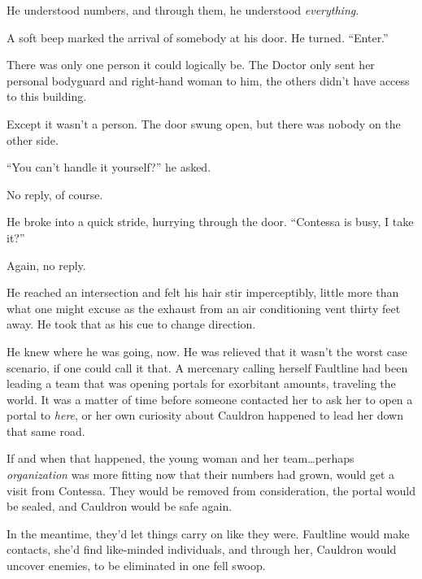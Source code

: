 He understood numbers, and through them, he understood \emph{everything}.



A soft beep marked the arrival of somebody at his door.  He turned.  ``Enter.''



There was only one person it could logically be.  The Doctor only sent her personal bodyguard and right-hand woman to him, the others didn't have access to this building.



Except it wasn't a person.  The door swung open, but there was nobody on the other side.



``You can't handle it yourself?'' he asked.



No reply, of course.



He broke into a quick stride, hurrying through the door.  ``Contessa is busy, I take it?''



Again, no reply.



He reached an intersection and felt his hair stir imperceptibly, little more than what one might excuse as the exhaust from an air conditioning vent thirty feet away.  He took that as his cue to change direction.



He knew where he was going, now.  He was relieved that it wasn't the worst case scenario, if one could call it that.  A mercenary calling herself Faultline had been leading a team that was opening portals for exorbitant amounts, traveling the world.  It was a matter of time before someone contacted her to ask her to open a portal to \emph{here}, or her own curiosity about Cauldron happened to lead her down that same road.



If and when that happened, the young woman and her team\ldots perhaps \emph{organization }was more fitting now that their numbers had grown, would get a visit from Contessa.  They would be removed from consideration, the portal would be sealed, and Cauldron would be safe again.



In the meantime, they'd let things carry on like they were.  Faultline would make contacts, she'd find like-minded individuals, and through her, Cauldron would uncover enemies, to be eliminated in one fell swoop.



